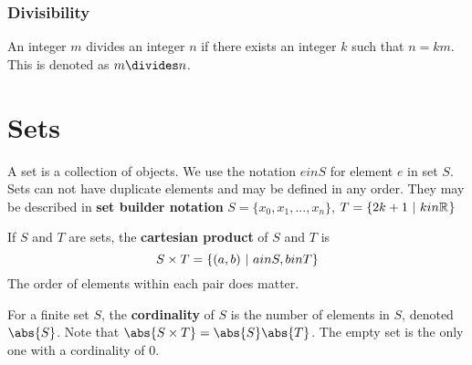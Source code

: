 \documentclass[12pt]{article}
\newcommand{\R}[1]{\mathbb{R}^{#1}}
\begin{document}


\subsubsection*{Divisibility}
 An integer $m$ divides an integer $n$ if there exists an integer $k$ such that $n = km$. This is denoted as $m \divides n$.



\section*{Sets}
A set is a collection of objects. We use the notation $e in S$ for element $e$ in set $S$. Sets can not have duplicate elements and may be defined in any order. They may be described in {\bf set builder notation} $S = \{ x_0, x_1, ... , x_n \}$, $T = \{ 2k + 1 \suchthat k in \R{} \}$

If $S$ and $T$ are sets, the {\bf cartesian product} of $S$ and $T$ is \[ S \times T = \{ (a,b) \ |\  a in S, b in T \} \] The order of elements within each pair does matter.

For a finite set $S$, the {\bf cordinality} of $S$ is the number of elements in $S$, denoted $\abs{S}$. Note that $\abs{S \times T} = \abs{S}\abs{T}$. The empty set is the only one with a cordinality of 0.
\end{document}
